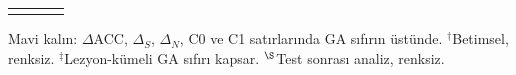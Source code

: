 \begin{table}[!htbp]
\begin{tabularx}{\textwidth}{>{\raggedright\arraybackslash}X ccc}
\botrule
\end{tabularx}
\par\smallskip\raggedright Mavi kalın: $\Delta$ACC, $\Delta_S$, $\Delta_N$, C0 ve C1 satırlarında GA sıfırın üstünde. $^{\dagger}$Betimsel, renksiz. $^{\ddagger}$Lezyon-kümeli GA sıfırı kapsar. $^{\S}$Test sonrası analiz, renksiz.
\end{table}
